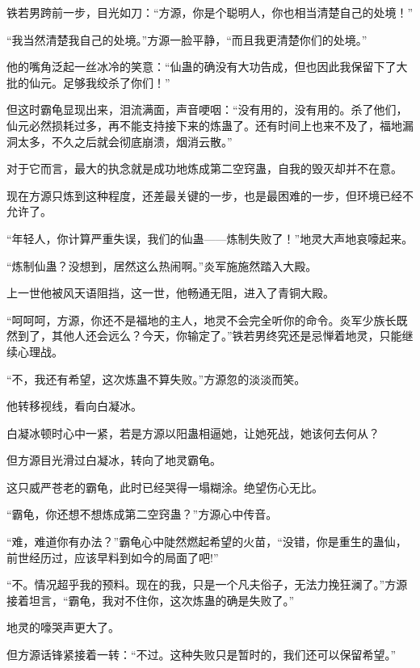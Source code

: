 
\begin{this_body}

铁若男跨前一步，目光如刀：“方源，你是个聪明人，你也相当清楚自己的处境！”

“我当然清楚我自己的处境。”方源一脸平静，“而且我更清楚你们的处境。”

他的嘴角泛起一丝冰冷的笑意：“仙蛊的确没有大功告成，但也因此我保留下了大批的仙元。足够我绞杀了你们！”

但这时霸龟显现出来，泪流满面，声音哽咽：“没有用的，没有用的。杀了他们，仙元必然损耗过多，再不能支持接下来的炼蛊了。还有时间上也来不及了，福地漏洞太多，不久之后就会彻底崩溃，烟消云散。”

对于它而言，最大的执念就是成功地炼成第二空窍蛊，自我的毁灭却并不在意。

现在方源只炼到这种程度，还差最关键的一步，也是最困难的一步，但环境已经不允许了。

“年轻人，你计算严重失误，我们的仙蛊——炼制失败了！”地灵大声地哀嚎起来。

“炼制仙蛊？没想到，居然这么热闹啊。”炎军施施然踏入大殿。

上一世他被风天语阻挡，这一世，他畅通无阻，进入了青铜大殿。

“呵呵呵，方源，你还不是福地的主人，地灵不会完全听你的命令。炎军少族长既然到了，其他人还会远么？今天，你输定了。”铁若男终究还是忌惮着地灵，只能继续心理战。

“不，我还有希望，这次炼蛊不算失败。”方源忽的淡淡而笑。

他转移视线，看向白凝冰。

白凝冰顿时心中一紧，若是方源以阳蛊相逼她，让她死战，她该何去何从？

但方源目光滑过白凝冰，转向了地灵霸龟。

这只威严苍老的霸龟，此时已经哭得一塌糊涂。绝望伤心无比。

“霸龟，你还想不想炼成第二空窍蛊？”方源心中传音。

“难，难道你有办法？”霸龟心中陡然燃起希望的火苗，“没错，你是重生的蛊仙，前世经历过，应该早料到如今的局面了吧!”

“不。情况超乎我的预料。现在的我，只是一个凡夫俗子，无法力挽狂澜了。”方源接着坦言，“霸龟，我对不住你，这次炼蛊的确是失败了。”

地灵的嚎哭声更大了。

但方源话锋紧接着一转：“不过。这种失败只是暂时的，我们还可以保留希望。”


\end{this_body}
